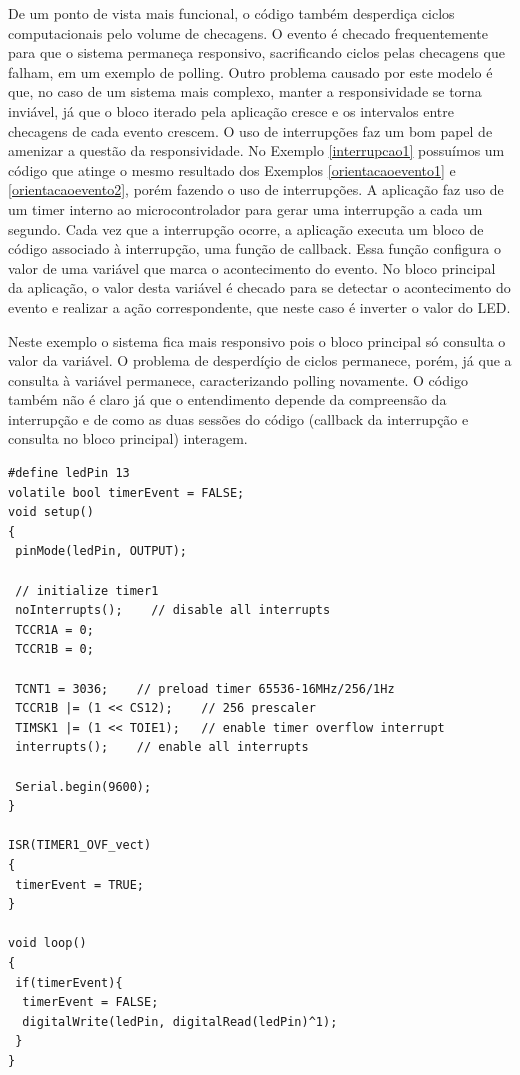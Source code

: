 \documentclass{article}
\begin{document}
\par De um ponto de vista mais funcional, o código também desperdiça ciclos computacionais pelo volume de checagens. O evento é checado frequentemente para que o sistema permaneça responsivo, sacrificando ciclos pelas checagens que falham, em um exemplo de polling. Outro problema causado por este modelo é que, no caso de um sistema mais complexo, manter a responsividade se torna inviável, já que o bloco iterado pela aplicação cresce e os intervalos entre checagens de cada evento crescem. O uso de interrupções faz um bom papel de amenizar a questão da responsividade. No Exemplo \ref{interrupcao1} possuímos um código que atinge o mesmo resultado dos Exemplos \ref{orientacaoevento1} e \ref{orientacaoevento2}, porém fazendo o uso de interrupções. A aplicação faz uso de um timer interno ao microcontrolador para gerar uma interrupção a cada um segundo. Cada vez que a interrupção ocorre, a aplicação executa um bloco de código associado à interrupção, uma função de callback. Essa função configura o valor de uma variável que marca o acontecimento do evento. No bloco principal da aplicação, o valor desta variável é checado para se detectar o acontecimento do evento e realizar a ação correspondente, que neste caso é inverter o valor do LED.
\par Neste exemplo o sistema fica mais responsivo pois o bloco principal só consulta o valor da variável. O problema de desperdíçio de ciclos permanece, porém, já que a consulta à variável permanece, caracterizando polling novamente. O código também não é claro já que o entendimento depende da compreensão da interrupção e de como as duas sessões do código (callback da interrupção e consulta no bloco principal) interagem.

\begin{lstlisting}[style=CStyle,label=interrupcao1,caption=Aplicação utilizando interrupção]
#define ledPin 13
volatile bool timerEvent = FALSE;
void setup()
{
 pinMode(ledPin, OUTPUT);

 // initialize timer1 
 noInterrupts();    // disable all interrupts
 TCCR1A = 0;
 TCCR1B = 0;

 TCNT1 = 3036;    // preload timer 65536-16MHz/256/1Hz
 TCCR1B |= (1 << CS12);    // 256 prescaler 
 TIMSK1 |= (1 << TOIE1);   // enable timer overflow interrupt
 interrupts();    // enable all interrupts
  
 Serial.begin(9600);
}

ISR(TIMER1_OVF_vect)
{
 timerEvent = TRUE;
}

void loop()
{
 if(timerEvent){
  timerEvent = FALSE;
  digitalWrite(ledPin, digitalRead(ledPin)^1);
 }
}
\end{lstlisting}
\end{document}
